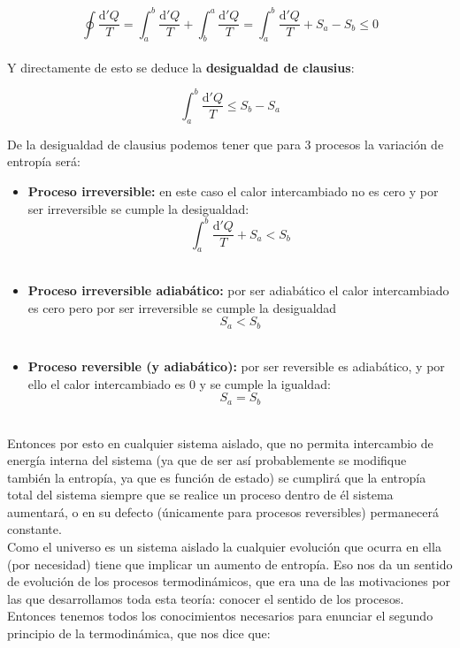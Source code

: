 \documentclass[12pt,a4paper]{article}
\newcommand{\D}{\mathrm{d}}
\begin{document}
$$ \oint \dfrac{\D ' Q}{T} = \int_a^b  \dfrac{\D' Q}{T} + \int_b^a  \dfrac{\D' Q}{T} = \int_a^b  \dfrac{\D' Q}{T}  + S_a - S_b \leq 0 $$ \\

Y directamente de esto se deduce la \textbf{desigualdad de clausius}:

\begin{equation}
\int_a^b  \dfrac{\D' Q}{T}  \leq S_b - S_a
\end{equation}

De la desigualdad de clausius podemos tener que para 3 procesos la variación de entropía será: 
\begin{itemize}
\item \textbf{Proceso irreversible:} en este caso el calor intercambiado no es cero y por ser irreversible se cumple la desigualdad: $$ \int_a^b  \dfrac{\D' Q}{T} + S_a < S_b $$ \\
\item \textbf{Proceso irreversible adiabático:} por ser adiabático el calor intercambiado es cero pero por ser irreversible se cumple la desigualdad $$ S_a < S_b  $$\\
\item \textbf{Proceso reversible (y adiabático):} por ser reversible es adiabático, y por ello el calor intercambiado es 0 y se cumple la igualdad: $$ S_a = S_b $$\\
\end{itemize}

Entonces por esto en cualquier sistema aislado, que no permita intercambio de energía interna del sistema (ya que de ser así probablemente se modifique también la entropía, ya que es función de estado) se cumplirá que la entropía   total del sistema siempre que se realice un proceso dentro de él sistema aumentará, o en su defecto (únicamente para procesos reversibles) permanecerá constante. \\


Como el universo es un sistema aislado la cualquier evolución que ocurra en ella (por necesidad) tiene que implicar un aumento de entropía. Eso nos da un sentido de evolución de los procesos termodinámicos, que era una de las motivaciones por las que desarrollamos toda esta teoría: conocer el sentido de los procesos. \\

Entonces tenemos todos los conocimientos necesarios para enunciar el segundo principio de la termodinámica, que nos dice que: \\
\end{document}
